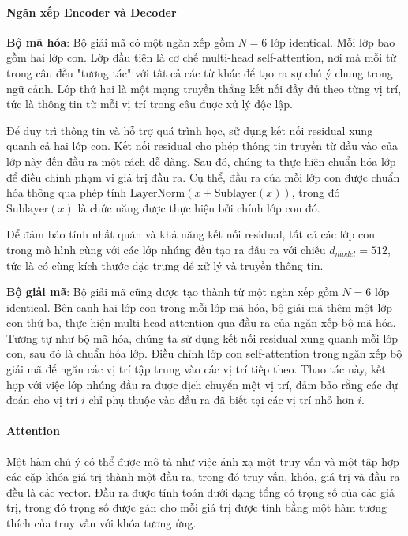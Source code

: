 \paragraph{Ngăn xếp Encoder và Decoder}
\textbf{Bộ mã hóa}: Bộ giải mã có một ngăn xếp gồm $N = 6$ lớp identical. Mỗi lớp bao gồm hai lớp con. Lớp đầu tiên là cơ chế  multi-head self-attention, nơi mà mỗi từ trong câu đều "tương tác" với tất cả các từ khác để tạo ra sự chú ý chung trong ngữ cảnh. Lớp thứ hai là một mạng truyền thẳng kết nối đầy đủ theo từng vị trí, tức là thông tin từ mỗi vị trí trong câu được xử lý độc lập.

Để duy trì thông tin và hỗ trợ quá trình học, sử dụng kết nối residual xung quanh cả hai lớp con. Kết nối residual cho phép thông tin truyền từ đầu vào của lớp này đến đầu ra một cách dễ dàng. Sau đó, chúng ta thực hiện chuẩn hóa lớp để điều chỉnh phạm vi giá trị đầu ra. Cụ thể, đầu ra của mỗi lớp con được chuẩn hóa thông qua phép tính $\text{LayerNorm}(x + \text{Sublayer}(x))$, trong đó $\text{Sublayer}(x)$ là chức năng được thực hiện bởi chính lớp con đó.

Để đảm bảo tính nhất quán và khả năng kết nối residual, tất cả các lớp con trong mô hình cùng với các lớp nhúng đều tạo ra đầu ra với chiều $d_{model} = 512$, tức là có cùng kích thước đặc trưng để xử lý và truyền thông tin.

\textbf{Bộ giải mã}: Bộ giải mã cũng được tạo thành từ một ngăn xếp gồm $N = 6$ lớp identical. Bên cạnh hai lớp con trong mỗi lớp mã hóa, bộ giải mã thêm một lớp con thứ ba, thực hiện multi-head attention qua đầu ra của ngăn xếp bộ mã hóa. Tương tự như bộ mã hóa, chúng ta sử dụng kết nối residual xung quanh mỗi lớp con, sau đó là chuẩn hóa lớp. Điều chỉnh lớp con self-attention trong ngăn xếp bộ giải mã để ngăn các vị trí tập trung vào các vị trí tiếp theo. Thao tác này, kết hợp với việc lớp nhúng đầu ra được dịch chuyển một vị trí, đảm bảo rằng các dự đoán cho vị trí $i$ chỉ phụ thuộc vào đầu ra đã biết tại các vị trí nhỏ hơn $i$.

\paragraph{Attention}
Một hàm chú ý có thể được mô tả như việc ánh xạ một truy vấn và một tập hợp các cặp khóa-giá trị thành một đầu ra, trong đó truy vấn, khóa, giá trị và đầu ra đều là các vector. Đầu ra được tính toán dưới dạng tổng có trọng số của các giá trị, trong đó trọng số được gán cho mỗi giá trị được tính bằng một hàm tương thích của truy vấn với khóa tương ứng.


